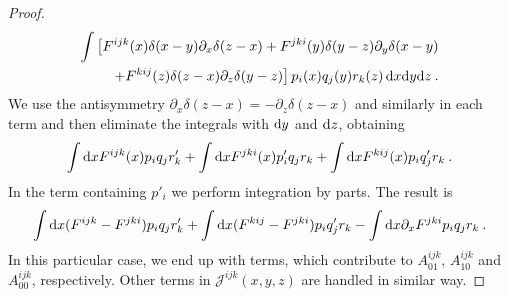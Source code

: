 \begin{proof}
    \begin{align*}
        \int \big[ F^{ijk}(x) \delta(x-y) \partial_x \delta(z-x) 
        + F^{jki}(y) \delta(y-z) \partial_y \delta(x-y) \\
        + F^{kij}(z) \delta(z-x) \partial_z \delta(y-z) \big] \,
        p_i(x) q_j(y) r_k(z) \,\mathrm{d} x \mathrm{d} y \mathrm{d} z \:.
    \end{align*}
    We use the antisymmetry $
        \partial_x \delta(z-x) = - \partial_z \delta (z-x)$
    and similarly in each term and then eliminate the integrals with $\mathrm{d} y$ and $\mathrm{d} z$, obtaining
    \begin{align*}
        \int \mathrm{d} x F^{ijk}(x) p_i q_j r'_k + \int \mathrm{d} x F^{jki}(x)  p'_i q_j r_k +
        \int \mathrm{d} x F^{kij}(x) p_i q'_j r_k \:.
    \end{align*}
    In the term containing $p'_i$ we perform integration by parts. The result is
    \begin{align*}
        \int \mathrm{d} x (F^{ijk}-F^{jki}) p_i q_j  r'_k +
        \int \mathrm{d} x (F^{kij}-F^{jki}) p_i q'_j r_k -
        \int \mathrm{d} x \partial_x F^{jki} p_i q_j r_k \:.
    \end{align*}
    In this particular case, we end up with terms, which contribute to $A^{ijk}_{01}$, $A^{ijk}_{10}$ and $A^{ijk}_{00}$, respectively. Other terms in $\mathcal J^{ijk}(x,y,z)$ are handled in similar way.


\end{proof}
